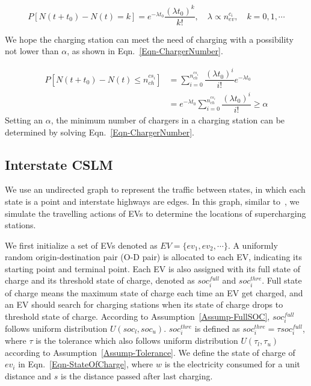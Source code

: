 \documentclass{mcmthesis}
\begin{document}
\begin{equation}\label{Eqn-Poisson}
P\left[N(t+t_{0})-N(t)=k\right]=e^{-\lambda t_{0}}\dfrac{(\lambda t_{0})^{k}}{k!},\quad\lambda\propto n_{ev}^{c_{i}},\quad k=0,1,\cdots
\end{equation}

We hope the charging station can meet the need of charging with a possibility not lower than $\alpha$, as shown in Eqn.~\eqref{Eqn-ChargerNumber}.

\begin{equation}\label{Eqn-ChargerNumber}
\begin{split}
P\left[N(t+t_{0})-N(t)\leq n_{ch}^{cs_{i}}\right] & =\sum_{i=0}^{n_{ch}^{cs_{i}}}\dfrac{(\lambda t_{0})^{i}}{i!}e^{-\lambda t_{0}} \\
  & =e^{-\lambda t_{0}}\sum_{i=0}^{n_{ch}^{cs_{i}}}\dfrac{(\lambda t_{0})^{i}}{i!}\geq\alpha
\end{split}
\end{equation}
Setting an $\alpha$, the minimum number of chargers in a charging station can be determined by solving Eqn.~\eqref{Eqn-ChargerNumber}.
\subsection{Interstate CSLM}\label{Sec-Interstate}
We use an undirected graph to represent the traffic between states, in which each state is a point and interstate highways are edges. In this graph, similar to~\cite{Dong2016}, we simulate the travelling actions of EVs to determine the locations of supercharging stations.

We first initialize a set of EVs denoted as $EV=\{ev_{1},ev_{2},\cdots\}$. A uniformly random origin-destination pair (O-D pair) is allocated to each EV, indicating its starting point and terminal point. Each EV is also assigned with its full state of charge and its threshold state of charge, denoted as $soc_{i}^{full}$ and $soc_{i}^{thre}$. Full state of charge means the maximum state of charge each time an EV get charged, and an EV should search for charging stations when its state of charge drops to threshold state of charge. According to Assumption~\ref{Assump-FullSOC}, $soc_{i}^{full}$ follows uniform distribution $U(soc_{l},soc_{u})$. $soc_{i}^{thre}$ is defined as $soc_{i}^{thre}=\tau soc_{i}^{full}$, where $\tau$ is the tolerance which also follows uniform distribution $U(\tau_{l},\tau_{u})$ according to Assumption~\ref{Assump-Tolerance}. We define the state of charge of $ev_{i}$ in Eqn.~\eqref{Eqn-StateOfCharge}, where $w$ is the electricity consumed for a unit distance and $s$ is the distance passed after last charging.
\end{document}
